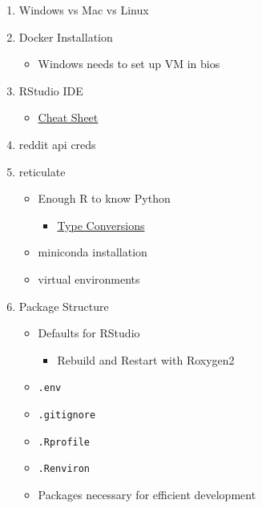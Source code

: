 \documentclass[
]{book}
\providecommand{\tightlist}{%
  \setlength{\itemsep}{0pt}\setlength{\parskip}{0pt}}
\begin{document}
\begin{enumerate}
\def\labelenumi{\arabic{enumi}.}
\tightlist
\item
  Windows vs Mac vs Linux
\item
  Docker Installation

  \begin{itemize}
  \tightlist
  \item
    Windows needs to set up VM in bios
  \end{itemize}
\item
  RStudio IDE

  \begin{itemize}
  \tightlist
  \item
    \href{https://raw.githubusercontent.com/rstudio/cheatsheets/main/rstudio-ide.pdf}{Cheat Sheet}
  \end{itemize}
\item
  reddit api creds
\item
  reticulate

  \begin{itemize}
  \tightlist
  \item
    Enough R to know Python

    \begin{itemize}
    \tightlist
    \item
      \href{https://rstudio.github.io/reticulate/}{Type Conversions}
    \end{itemize}
  \item
    miniconda installation
  \item
    virtual environments
  \end{itemize}
\item
  Package Structure

  \begin{itemize}
  \tightlist
  \item
    Defaults for RStudio

    \begin{itemize}
    \tightlist
    \item
      Rebuild and Restart with Roxygen2
    \end{itemize}
  \item
    \texttt{.env}
  \item
    \texttt{.gitignore}
  \item
    \texttt{.Rprofile}
  \item
    \texttt{.Renviron}
  \item
    Packages necessary for efficient development


\end{itemize}
\end{enumerate}
\end{document}
